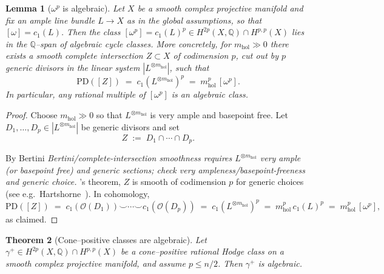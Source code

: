 \documentclass[11pt]{article}
\numberwithin{equation}{section}  %
\theoremstyle{plain}
\newtheorem{theorem}{Theorem}[section]
\newtheorem{lemma}[theorem]{Lemma}
\theoremstyle{definition}
\theoremstyle{remark}
\newcommand{\Q}{\mathbb{Q}}
\newcommand{\mhol}{m_{\mathrm{hol}}} %
\begin{document}
\begin{lemma}[$\omega^p$ is algebraic]\label{lem:gamma-minus-alg}
Let $X$ be a smooth complex projective manifold and fix an ample line bundle $L\to X$
as in the global assumptions, so that $[\omega]=c_1(L)$.
Then the class $[\omega^p]=c_1(L)^p\in H^{2p}(X,\Q)\cap H^{p,p}(X)$ lies in the $\Q$--span
of algebraic cycle classes.  More concretely, for $\mhol\gg 0$ there exists a smooth complete
intersection $Z\subset X$ of codimension $p$, cut out by $p$ generic divisors in the
linear system $|L^{\otimes \mhol}|$, such that
\[
\mathrm{PD}([Z]) \;=\; c_1(L^{\otimes \mhol})^p \;=\; \mhol^p\,[\omega^p].
\]
In particular, any rational multiple of $[\omega^p]$ is an algebraic class.
\end{lemma}

\begin{proof}
Choose $\mhol\gg 0$ so that $L^{\otimes \mhol}$ is very ample and basepoint free.
Let $D_1,\dots,D_p\in |L^{\otimes \mhol}|$ be generic divisors and set
\[
Z \;:=\; D_1\cap\cdots\cap D_p.
\]


By Bertini
\emph{Bertini/complete-intersection smoothness requires $L^{\otimes \mhol}$ very ample (or basepoint free) and generic sections; check very ampleness/basepoint-freeness and generic choice.}
's theorem, $Z$ is smooth of codimension $p$ for generic choices
(see e.g.\ Hartshorne~\cite{Hartshorne77}).
In cohomology,
\[
\mathrm{PD}([Z]) \;=\; c_1(\mathcal O(D_1))\smile\cdots\smile c_1(\mathcal O(D_p))
\;=\; c_1(L^{\otimes \mhol})^p \;=\; \mhol^p\,c_1(L)^p \;=\; \mhol^p\,[\omega^p],
\]
as claimed.
\end{proof}


\begin{theorem}[Cone--positive classes are algebraic]\label{thm:effective-algebraic}
Let $\gamma^+ \in H^{2p}(X,\Q) \cap H^{p,p}(X)$ be a cone--positive rational
Hodge class on a smooth complex projective manifold, and assume $p\le n/2$.
Then $\gamma^+$
is algebraic.
\end{theorem}
\end{document}
